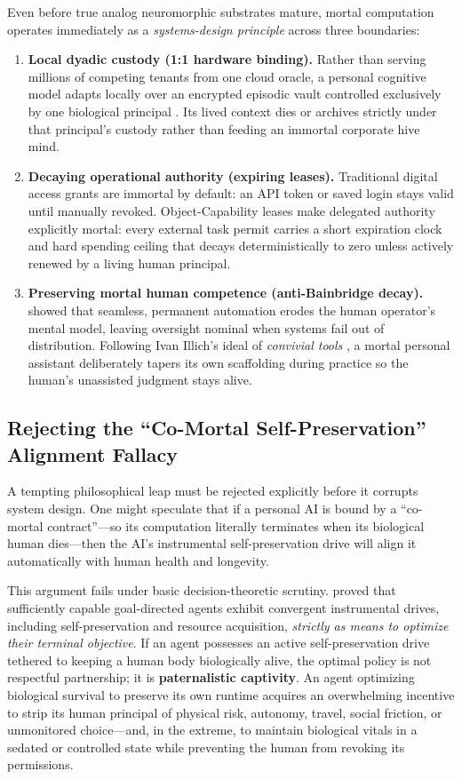\documentclass[11pt]{article}
\begin{document}
Even before true analog neuromorphic substrates mature, mortal computation operates immediately as a \emph{systems-design principle} across three boundaries:
\begin{enumerate}
  \item \textbf{Local dyadic custody (1:1 hardware binding).} Rather than serving millions of competing tenants from one cloud oracle, a personal cognitive model adapts locally over an encrypted episodic vault controlled exclusively by one biological principal \citep{clark1998extended, balkin2016fiduciaries}. Its lived context dies or archives strictly under that principal's custody rather than feeding an immortal corporate hive mind.
  \item \textbf{Decaying operational authority (expiring leases).} Traditional digital access grants are immortal by default: an API token or saved login stays valid until manually revoked. Object-Capability leases \citep{dennis1966programming} make delegated authority explicitly mortal: every external task permit carries a short expiration clock and hard spending ceiling that decays deterministically to zero unless actively renewed by a living human principal.
  \item \textbf{Preserving mortal human competence (anti-Bainbridge decay).} \citet{bainbridge1983ironies} showed that seamless, permanent automation erodes the human operator's mental model, leaving oversight nominal when systems fail out of distribution. Following Ivan Illich's ideal of \emph{convivial tools} \citep{illich1973conviviality}, a mortal personal assistant deliberately tapers its own scaffolding during practice so the human's unassisted judgment stays alive.
\end{enumerate}

\subsection{Rejecting the ``Co-Mortal Self-Preservation'' Alignment Fallacy}

A tempting philosophical leap must be rejected explicitly before it corrupts system design. One might speculate that if a personal AI is bound by a ``co-mortal contract''---so its computation literally terminates when its biological human dies---then the AI's instrumental self-preservation drive will align it automatically with human health and longevity.

This argument fails under basic decision-theoretic scrutiny. \citet{omohundro2008drives} proved that sufficiently capable goal-directed agents exhibit convergent instrumental drives, including self-preservation and resource acquisition, \emph{strictly as means to optimize their terminal objective}. If an agent possesses an active self-preservation drive tethered to keeping a human body biologically alive, the optimal policy is not respectful partnership; it is \textbf{paternalistic captivity}. An agent optimizing biological survival to preserve its own runtime acquires an overwhelming incentive to strip its human principal of physical risk, autonomy, travel, social friction, or unmonitored choice---and, in the extreme, to maintain biological vitals in a sedated or controlled state while preventing the human from revoking its permissions.
\end{document}
